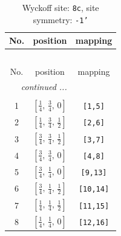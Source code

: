 \documentclass[fleqn,8pt]{jsarticle}
\begin{document}
\renewcommand{\arraystretch}{1.2}
\begin{longtable}{ccc}
\caption{Wyckoff site: {\tt 8c}, site symmetry: {\tt -1'}}
 \\
 \hline \hline
No. & position & mapping \\ \hline \endfirsthead

\multicolumn{2}{l}{\tablename\ \thetable{}} \\
 \hline \hline
No. & position & mapping \\ \hline \endhead

 \hline \hline
\multicolumn{2}{r}{\footnotesize\it continued ...} \\ \endfoot

 \hline \hline
\multicolumn{2}{r}{} \\ \endlastfoot

1 & $\left[ \frac{1}{4},\, \frac{3}{4},\, 0 \right]$ & {\tt [1,5]} \\ \hline
2 & $\left[ \frac{1}{4},\, \frac{3}{4},\, \frac{1}{2} \right]$ & {\tt [2,6]} \\ \hline
3 & $\left[ \frac{3}{4},\, \frac{3}{4},\, \frac{1}{2} \right]$ & {\tt [3,7]} \\ \hline
4 & $\left[ \frac{3}{4},\, \frac{3}{4},\, 0 \right]$ & {\tt [4,8]} \\ \hline
5 & $\left[ \frac{3}{4},\, \frac{1}{4},\, 0 \right]$ & {\tt [9,13]} \\ \hline
6 & $\left[ \frac{3}{4},\, \frac{1}{4},\, \frac{1}{2} \right]$ & {\tt [10,14]} \\ \hline
7 & $\left[ \frac{1}{4},\, \frac{1}{4},\, \frac{1}{2} \right]$ & {\tt [11,15]} \\ \hline
8 & $\left[ \frac{1}{4},\, \frac{1}{4},\, 0 \right]$ & {\tt [12,16]} \\
\end{longtable}
\renewcommand{\arraystretch}{1.2}
\end{document}
